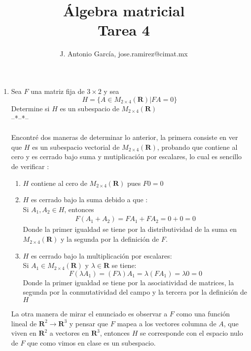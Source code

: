 \documentclass[letter]{memoir} %
\begin{document}
\title{\textbf{Álgebra matricial
 \\Tarea 4 }}

\begin{center}
\author{J. Antonio Garc\'ia, jose.ramirez@cimat.mx}
\end{center}
\maketitle
\begin{enumerate}

\item 
Sea $F$ una matriz fija de $3\times2$ y sea 
\[
	H = \{A \in M_{2\times4}(\mathbf{R}) | FA = 0 \}
\]
Determine si $H$ es un subespacio de $M_{2\times4}(\mathbf{R})$ \\
--*--*-- \\\\
Encontré dos maneras de determinar lo anterior, la primera consiste en ver que $H$ es un subespacio vectorial de $M_{2\times4}(\mathbf{R})$, probando que contiene al cero y es cerrado bajo suma y mutiplicación por escalares, lo cual es sencillo de verificar :\\
\begin{enumerate}
\item $H$ contiene al cero de $M_{2\times4}(\mathbf{R})$ pues $F 0  = 0 $
\item $H$ es cerrado bajo la suma debido a que :\\
Si $A_1,A_2 \in H$, entonces 
\begin{equation*}
\begin{split}
F(A_1+A_2) =   FA_1 + FA_2 = 0+0 = 0
\end{split}
\end{equation*}
Donde la primer igualdad se tiene por la distributividad de la suma en $M_{2\times4}(\mathbf{R})$ y la segunda por la definición de $F$.
\item $H$ es cerrado bajo la multiplicación por escalares:\\
Si $A_1 \in M_{2\times4}(\mathbf{R})$ y $\lambda \in \mathbf{R} $ se tiene:\\
\[
	F\left( \lambda A_1 \right) = \left(F \lambda \right) A_1 = \lambda (FA_1) = \lambda0 = 0  
\]
Donde la primer igualdad se tiene por la asociatividad de matrices, la segunda por la conmutatividad del campo y la tercera por la definición de $H$
\end{enumerate}
La otra manera de mirar el enunciado es observar a $F$ como una función lineal de $\mathbf{R}^2 \rightarrow \mathbf{R} ^3$ y pensar que $F$ mapea a los vectores columna de $A$, que viven en $\mathbf{R}^2$ a vectores en $\mathbf{R}^3$, entonces $H$ se corresponde con el espacio nulo de $F$ que como vimos en clase es un subespacio.

\end{enumerate}
\end{document}
